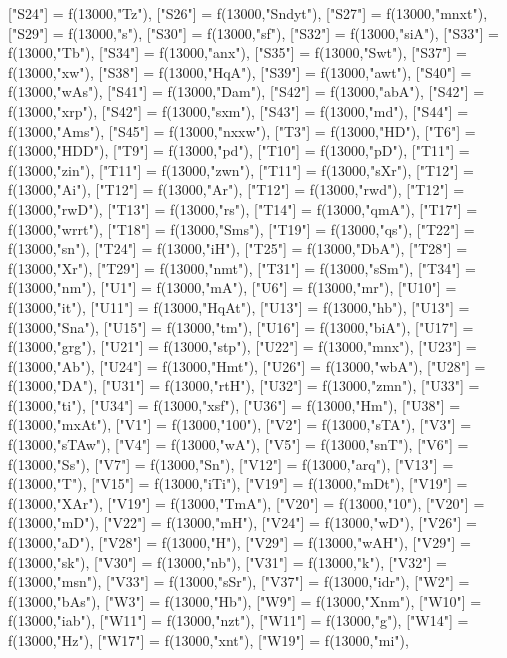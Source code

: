 \documentclass{article}
\begin{document}
\begin{luacode*}
{	["S24"] = f(13000,"Tz"),
	["S26"] = f(13000,"Sndyt"),
	["S27"] = f(13000,"mnxt"),
	["S29"] = f(13000,"s"),
	["S30"] = f(13000,"sf"),
	["S32"] = f(13000,"siA"),
	["S33"] = f(13000,"Tb"),
	["S34"] = f(13000,"anx"),
	["S35"] = f(13000,"Swt"),
	["S37"] = f(13000,"xw"),
	["S38"] = f(13000,"HqA"),
	["S39"] = f(13000,"awt"),
	["S40"] = f(13000,"wAs"),
	["S41"] = f(13000,"Dam"),
	["S42"] = f(13000,"abA"),
	["S42"] = f(13000,"xrp"),
	["S42"] = f(13000,"sxm"),
	["S43"] = f(13000,"md"),
	["S44"] = f(13000,"Ams"),
	["S45"] = f(13000,"nxxw"),
	["T3"] = f(13000,"HD"),
	["T6"] = f(13000,"HDD"),
	["T9"] = f(13000,"pd"),
	["T10"] = f(13000,"pD"),
	["T11"] = f(13000,"zin"),
	["T11"] = f(13000,"zwn"),
	["T11"] = f(13000,"sXr"),
	["T12"] = f(13000,"Ai"),
	["T12"] = f(13000,"Ar"),
	["T12"] = f(13000,"rwd"),
	["T12"] = f(13000,"rwD"),
	["T13"] = f(13000,"rs"),
	["T14"] = f(13000,"qmA"),
	["T17"] = f(13000,"wrrt"),
	["T18"] = f(13000,"Sms"),
	["T19"] = f(13000,"qs"),
	["T22"] = f(13000,"sn"),
	["T24"] = f(13000,"iH"),
	["T25"] = f(13000,"DbA"),
	["T28"] = f(13000,"Xr"),
	["T29"] = f(13000,"nmt"),
	["T31"] = f(13000,"sSm"),
	["T34"] = f(13000,"nm"),
	["U1"] = f(13000,"mA"),
	["U6"] = f(13000,"mr"),
	["U10"] = f(13000,"it"),
	["U11"] = f(13000,"HqAt"),
	["U13"] = f(13000,"hb"),
	["U13"] = f(13000,"Sna"),
	["U15"] = f(13000,"tm"),
	["U16"] = f(13000,"biA"),
	["U17"] = f(13000,"grg"),
	["U21"] = f(13000,"stp"),
	["U22"] = f(13000,"mnx"),
	["U23"] = f(13000,"Ab"),
	["U24"] = f(13000,"Hmt"),
	["U26"] = f(13000,"wbA"),
	["U28"] = f(13000,"DA"),
	["U31"] = f(13000,"rtH"),
	["U32"] = f(13000,"zmn"),
	["U33"] = f(13000,"ti"),
	["U34"] = f(13000,"xsf"),
	["U36"] = f(13000,"Hm"),
	["U38"] = f(13000,"mxAt"),
	["V1"] = f(13000,"100"),
	["V2"] = f(13000,"sTA"),
	["V3"] = f(13000,"sTAw"),
	["V4"] = f(13000,"wA"),
	["V5"] = f(13000,"snT"),
	["V6"] = f(13000,"Ss"),
	["V7"] = f(13000,"Sn"),
	["V12"] = f(13000,"arq"),	
	["V13"] = f(13000,"T"),
	["V15"] = f(13000,"iTi"),
	["V19"] = f(13000,"mDt"),
	["V19"] = f(13000,"XAr"),
	["V19"] = f(13000,"TmA"),
	["V20"] = f(13000,"10"),
	["V20"] = f(13000,"mD"),
	["V22"] = f(13000,"mH"),
	["V24"] = f(13000,"wD"),
	["V26"] = f(13000,"aD"),
	["V28"] = f(13000,"H"),
	["V29"] = f(13000,"wAH"),
	["V29"] = f(13000,"sk"),
	["V30"] = f(13000,"nb"),
	["V31"] = f(13000,"k"),
	["V32"] = f(13000,"msn"),
	["V33"] = f(13000,"sSr"),
	["V37"] = f(13000,"idr"),
	["W2"] = f(13000,"bAs"),
	["W3"] = f(13000,"Hb"),
	["W9"] = f(13000,"Xnm"),
	["W10"] = f(13000,"iab"),
	["W11"] = f(13000,"nzt"),
	["W11"] = f(13000,"g"),
	["W14"] = f(13000,"Hz"),
	["W17"] = f(13000,"xnt"),
	["W19"] = f(13000,"mi"),
}
\end{luacode*}
\end{document}
